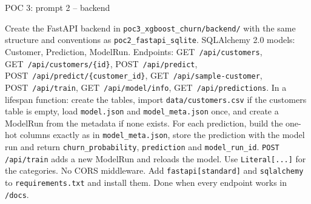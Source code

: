 \documentclass[aspectratio=169,11pt]{beamer}
\begin{document}
\begin{frame}{POC 3: prompt 2 -- backend}
  \vspace{2pt}
  \begin{promptbox}
    Create the FastAPI backend in \texttt{poc3\_xgboost\_churn/backend/} with the same structure and conventions as \texttt{poc2\_fastapi\_sqlite}. SQLAlchemy 2.0 models: Customer, Prediction, ModelRun.
    Endpoints: GET~\texttt{/api/customers}, GET~\texttt{/api/customers/\{id\}}, POST~\texttt{/api/predict}, POST~\texttt{/api/predict/\{customer\_id\}}, GET~\texttt{/api/sample-customer}, POST~\texttt{/api/train}, GET~\texttt{/api/model/info}, GET~\texttt{/api/predictions}.
    In a lifespan function: create the tables, import \texttt{data/customers.csv} if the customers table is empty, load \texttt{model.json} and \texttt{model\_meta.json} once, and create a ModelRun from the metadata if none exists. For each prediction, build the one-hot columns exactly as in \texttt{model\_meta.json}, store the prediction with the model run and return \texttt{churn\_probability}, \texttt{prediction} and \texttt{model\_run\_id}. \mbox{\texttt{POST /api/train}} adds a new ModelRun and reloads the model. Use \texttt{Literal[...]} for the categories. No CORS middleware. Add \texttt{fastapi[standard]} and \texttt{sqlalchemy} to \texttt{requirements.txt} and install them. Done when every endpoint works in \texttt{/docs}.
  \end{promptbox}
\end{frame}
\end{document}

